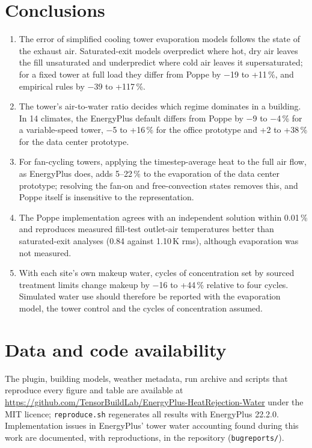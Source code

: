 \documentclass[preprint,12pt]{elsarticle}
\begin{document}
\section{Conclusions}\label{sec:conclusions}
\begin{enumerate}
\item The error of simplified cooling tower evaporation models follows the state of the exhaust air. Saturated-exit models
overpredict where hot, dry air leaves the fill unsaturated and underpredict where cold air leaves it supersaturated; for a
fixed tower at full load they differ from Poppe by $-$19 to +11\,\%, and empirical rules by $-$39 to +117\,\%.
\item The tower's air-to-water ratio decides which regime dominates in a building. In 14 climates, the EnergyPlus default
differs from Poppe by $-$9 to $-$4\,\% for a variable-speed tower, $-$5 to +16\,\% for the office prototype and +2 to +38\,\%
for the data center prototype.
\item For fan-cycling towers, applying the timestep-average heat to the full air flow, as EnergyPlus does, adds 5--22\,\% to
the evaporation of the data center prototype; resolving the fan-on and free-convection states removes this, and Poppe
itself is insensitive to the representation.
\item The Poppe implementation agrees with an independent solution within 0.01\,\% and reproduces measured fill-test
outlet-air temperatures better than saturated-exit analyses (0.84 against 1.10\,K rms), although evaporation was not
measured.
\item With each site's own makeup water, cycles of concentration set by sourced treatment limits change makeup by $-$16 to
+44\,\% relative to four cycles. Simulated water use should therefore be reported with the evaporation model, the tower
control and the cycles of concentration assumed.
\end{enumerate}

\section*{Data and code availability}
The plugin, building models, weather metadata, run archive and scripts that reproduce every figure and table are
available at \url{https://github.com/TensorBuildLab/EnergyPlus-HeatRejection-Water} under the MIT licence;
\texttt{reproduce.sh} regenerates all results with EnergyPlus 22.2.0. Implementation issues in EnergyPlus' tower water
accounting found during this work are documented, with reproductions, in the repository (\texttt{bugreports/}).



\end{document}
